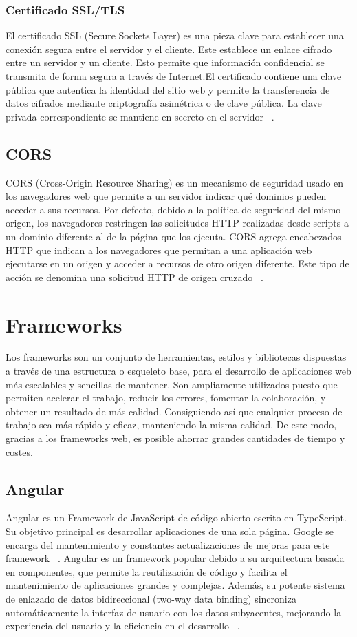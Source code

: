 \subsubsection{Certificado SSL/TLS}
El certificado SSL (Secure Sockets Layer) es una pieza clave para establecer una conexión segura entre el servidor y el cliente. Este establece un enlace cifrado entre un servidor y un cliente. Esto permite que información confidencial se transmita de forma segura a través de Internet.El certificado contiene una clave pública que autentica la identidad del sitio web y permite la transferencia de datos cifrados mediante criptografía asimétrica o de clave pública. La clave privada correspondiente se mantiene en secreto en el servidor ~\cite{SSL-TLS}.

\subsection{CORS}
CORS (Cross-Origin Resource Sharing) es un mecanismo de seguridad usado en los navegadores web que permite a un servidor indicar qué dominios pueden acceder a sus recursos. Por defecto, debido a la política de seguridad del mismo origen, los navegadores restringen las solicitudes HTTP realizadas desde scripts a un dominio diferente al de la página que los ejecuta. CORS agrega encabezados HTTP que indican a los navegadores que permitan a una aplicación web ejecutarse en un origen y acceder a recursos de otro origen diferente. Este tipo de acción se denomina una solicitud HTTP de origen cruzado ~\cite{CORS}.

\section{Frameworks}
Los frameworks son un conjunto de herramientas, estilos y bibliotecas dispuestas a través de una estructura o esqueleto base, para el desarrollo de aplicaciones web más escalables y sencillas de mantener. Son ampliamente utilizados puesto que permiten acelerar el trabajo, reducir los errores, fomentar la colaboración, y obtener un resultado de más calidad. Consiguiendo así que cualquier proceso de trabajo sea más rápido y eficaz, manteniendo la misma calidad. De este modo, gracias a los frameworks web, es posible ahorrar grandes cantidades de tiempo y costes.

\subsection{Angular}
Angular es un Framework de JavaScript de código abierto escrito en TypeScript. Su objetivo principal es desarrollar aplicaciones de una sola página. Google se encarga del mantenimiento y constantes actualizaciones de mejoras para este framework ~\cite{AngularDOCS}. Angular es un framework popular debido a su arquitectura basada en componentes, que permite la reutilización de código y facilita el mantenimiento de aplicaciones grandes y complejas. Además, su potente sistema de enlazado de datos bidireccional (two-way data binding) sincroniza automáticamente la interfaz de usuario con los datos subyacentes, mejorando la experiencia del usuario y la eficiencia en el desarrollo ~\cite{AngularDOCS}.


